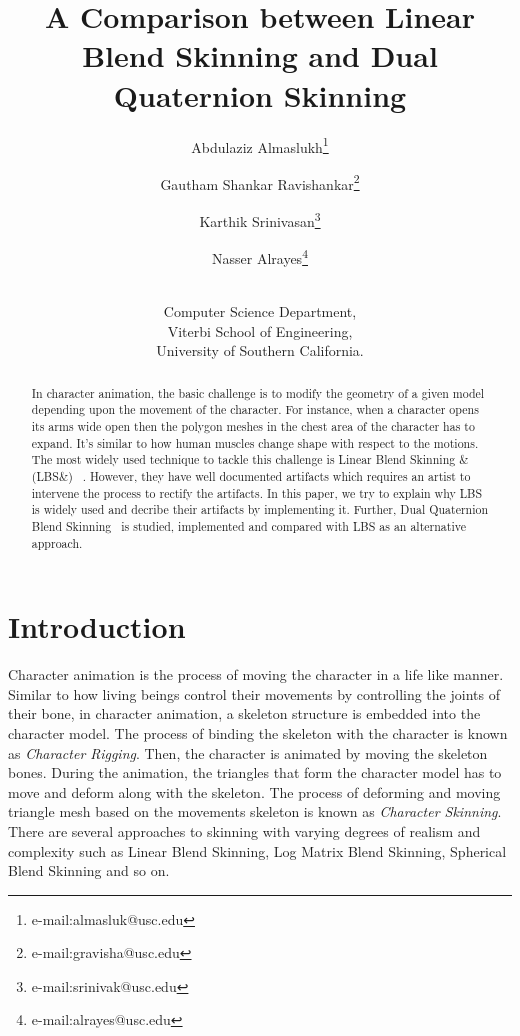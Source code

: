 \documentclass[annual]{styles/acmsiggraph}
\title{A Comparison between Linear Blend Skinning and Dual Quaternion Skinning}
\author{Abdulaziz Almaslukh\thanks{e-mail:almasluk@usc.edu}\\
\and Gautham Shankar Ravishankar\thanks{e-mail:gravisha@usc.edu}\\
\and Karthik Srinivasan\thanks{e-mail:srinivak@usc.edu}\\
\and Nasser Alrayes\thanks{e-mail:alrayes@usc.edu}\\
\and \\
Computer Science Department,\\
Viterbi School of Engineering,\\
University of Southern California.}
\begin{document}
\maketitle
\begin{abstract}
In character animation, the basic challenge is to modify the geometry of a given model depending upon the movement of the character. For instance, when a character opens its arms wide open then the polygon meshes in the chest area of the character has to expand. It's similar to how human muscles change shape with respect to the motions. The most widely used technique to tackle this challenge is Linear Blend Skinning &(LBS&) ~\cite{Jacka:2007:CLS:1294685.1294715}. However, they have well documented artifacts which requires an artist to intervene the process to rectify the artifacts. In this paper, we try to explain why LBS is widely used and decribe their artifacts by implementing it. Further, Dual Quaternion Blend Skinning~\cite{Kavan-07-SDQ} is studied, implemented and compared with LBS as an alternative approach.
\end{abstract}
\keywordlist
\section{Introduction}

Character animation is the process of moving the character in a life like manner. Similar to how living beings control their movements by controlling the joints of their bone, in character animation, a skeleton structure is embedded into the character model. The process of binding the skeleton with the character is known as \textit{Character Rigging}. Then, the character is animated by moving the skeleton bones. During the animation, the triangles that form the character model has to move and deform along with the skeleton. The process of deforming and moving triangle mesh based on the movements skeleton is known as \textit{Character Skinning}. There are several approaches to skinning with varying degrees of realism and complexity such as Linear Blend Skinning, Log Matrix Blend Skinning, Spherical Blend Skinning and so on.
\end{document}
